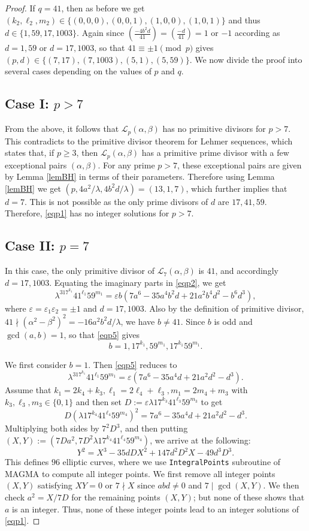 \documentclass[12pt, 14paper,reqno]{amsart}
\theoremstyle{plain}
\theoremstyle{proof}
\numberwithin{equation}{section}
\begin{document}
\begin{proof}
If $q=41$, then as before we get  $(k_2, \ell_2, m_2)\in\{(0,0,0), (0,0,1), (1,0,0), (1,0,1)\}$ and thus $d\in\{1,59, 17, 1003\}$. Again since $\left(\frac{-4b^2d}{41}\right)=\left(\frac{-d}{41}\right)=1$ or $-1$ according as $d=1,59$ or $d=17, 1003$, so that $41\equiv \pm 1\pmod p$ gives $(p, d)\in\{(7,17),(7,1003), (5,1), (5,59)\}$. We now divide the proof into several cases depending on the values of $p$ and $q$.
\subsection*{Case I:  $p>7$} 
From the above, it follows that $\mathcal{L}_p(\alpha, \beta)$ has no primitive divisors for $p>7$. This contradicts to the primitive divisor theorem for Lehmer sequences, which states that, if $p\geq 3$, then $\mathcal{L}_p(\alpha, \beta)$ has a primitive prime divisor with a few exceptional pairs $(\alpha, \beta)$. For any prime $p> 7$, these exceptional pairs are given by Lemma \ref{lemBH} in terms of their parameters. Therefore using Lemma \ref{lemBH} we get $(p,4a^2/\lambda, 4b^2d/\lambda)=(13,1,7)$, which further implies that $d=7$. This is not possible as the only prime divisors of $d$ are $17, 41, 59$. Therefore, \eqref{eqp1} has no integer solutions for $p>7$. 
\subsection*{Case II:  $p=7$} 
In this case, the only primitive divisor of $\mathcal{L}_7(\alpha, \beta)$ is $41$, and accordingly  $d=17, 1003$. Equating the imaginary parts in \eqref{eqp2}, we get 
\begin{equation}\label{eqp5}
\lambda^317^{k_1}41^{\ell_1}59^{m_1}=\varepsilon b(7a^6-35a^4b^2d+21a^2b^4d^2-b^6d^3),
\end{equation}
where $\varepsilon=\varepsilon_1\varepsilon_2=\pm 1$ and $d=17, 1003$. Also by the definition of primitive divisor, $41\nmid (\alpha^2-\beta^2)^2=-16a^2b^2d/\lambda$, we have $b\ne 41$. Since $b$ is odd and $\gcd(a, b)=1$, so that \eqref{eqp5} gives 
$$b=1,17^{k_1},59^{m_1}, 17^{k_1}59^{m_1}.$$

We first consider $b=1$. Then \eqref{eqp5} reduces to
$$\lambda^317^{k_1}41^{\ell_1}59^{m_1}=\varepsilon (7a^6-35a^4d+21a^2d^2-d^3).$$
 Assume that $k_1=2k_4+k_3, \ell_1=2\ell_4+\ell_3, m_1=2m_4+m_3$ with $k_3, \ell_3, m_3\in\{0, 1\}$ and then set $D:=\varepsilon\lambda 17^{k_3}41^{\ell_3}59^{m_3}$ to get
$$D(\lambda 17^{k_4}41^{\ell_4}59^{m_4})^2=7a^6-35a^4d+21a^2d^2-d^3.$$
Multiplying both sides by $7^2D^3$, and then putting $(X, Y):=(7Da^2, 7D^2\lambda 17^{k_4}41^{\ell_4}59^{m_4})$, we arrive at the following:
$$Y^2=X^3-35dDX^2+147d^2D^2X-49d^3D^3.$$
This defines $96$ elliptic curves, where we use \texttt{IntegralPoints} subroutine of MAGMA to compute all integer points. We first remove all integer points $(X,Y)$ satisfying $XY=0$ or $7\nmid X$ since $abd\ne0$ and $7\mid \gcd(X,Y)$. We then check $a^2=X/{7D}$ for the remaining points $(X,Y)$; but none of these shows that $a$ is an integer. Thus, none of these integer points lead to an integer solutions of \eqref{eqp1}. 


\end{proof}
\end{document}
